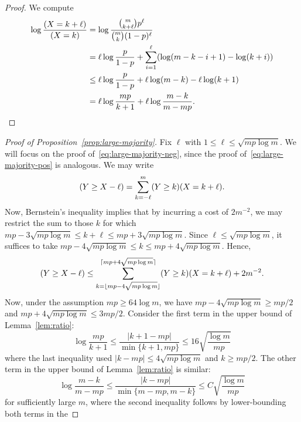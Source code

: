 \documentclass[EJP]{ejpecp}
\newcommand{\1}[1]{\mathbbm{1}_{\{#1\}}}
\let\Pr\relax
\DeclareMathOperator{\Pr}{Pr}
\begin{document}
\begin{proof}
 We compute
 \begin{align*}
  \log \frac {\Pr(X = k + \ell)}{\Pr(X = k)}
  &= \log \frac {\binom{m}{k+\ell} p^\ell} {\binom mk (1-p)^\ell} \\
  &= \ell \log \frac{p}{1-p} + \sum_{i=1}^\ell (\log(m-k-i+1) - \log(k+i)) \\
  &\le \ell \log \frac{p}{1-p} + \ell \log(m-k) - \ell \log(k+1) \\
  &= \ell \log \frac{mp}{k+1} + \ell \log \frac{m-k}{m-mp}.
  \qedhere
 \end{align*}
\end{proof}

\begin{proof}[Proof of Proposition~\ref{prop:large-majority}]
 Fix $\ell$ with $1 \le \ell \le \sqrt{mp \log m}$.
 We will focus on the proof of~\eqref{eq:large-majority-neg},
 since the proof of~\eqref{eq:large-majority-pos} is analogous.
 We may write
 \[
  \Pr(Y \ge X - \ell)
  = \sum_{k=-\ell}^m \Pr(Y \ge k) \Pr(X = k + \ell).
 \]
 Now, Bernstein's inequality implies that by incurring
 a cost of $2m^{-2}$, we may restrict the sum to those $k$ for which
 $mp - 3\sqrt{mp \log m} \le k + \ell \le mp + 3\sqrt{mp \log m}$.
 Since $\ell \le \sqrt{mp \log m}$, it suffices to take
 $mp - 4\sqrt{mp \log m} \le k \le mp + 4\sqrt{mp \log m}$. Hence,
 \begin{equation}\label{eq:constant-majority-1}
  \Pr(Y \ge X - \ell)
  \le \sum_{k=\lfloor mp - 4\sqrt{mp \log m}\rfloor}
	  ^{\lceil mp + 4\sqrt{mp \log m}\rceil}
	  \Pr(Y \ge k) \Pr(X = k + \ell) + 2m^{-2}.
 \end{equation}
 Now, under the assumption $mp \ge 64 \log m$, we have
 $mp - 4\sqrt{mp \log m} \ge mp/2$ and
 $mp + 4\sqrt{mp \log m} \le 3mp/2$.
 Consider the first term in the upper bound of Lemma~\ref{lem:ratio}:
 \begin{equation}\label{eq:ratio-term-1}
  \log \frac{mp}{k+1}
  \le \frac{|k+1-mp|}{\min\{k+1,mp\}}
  \le 16 \sqrt{\frac{\log m}{mp}}
 \end{equation}
 where the last inequality used $|k - mp| \le 4 \sqrt{mp \log m}$ and
 $k \ge mp/2$. The other term in the upper bound of Lemma~\ref{lem:ratio} is similar:
 \begin{equation}\label{eq:ratio-term-2}
     \log \frac{m-k}{m-mp} \le \frac{|k-mp|}{\min\{m-mp, m-k\}}
     \le C \sqrt{\frac{\log m}{mp}}
 \end{equation}
 for sufficiently large $m$,
 where the second inequality follows by lower-bounding both terms in the

\end{proof}
\end{document}
